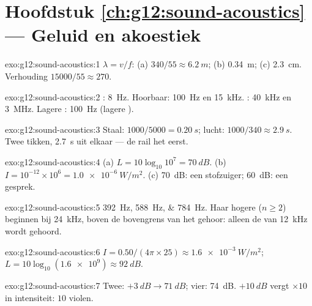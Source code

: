 \section*{Hoofdstuk \ref{ch:g12:sound-acoustics} --- Geluid en akoestiek}

\begin{solution}{exo:g12:sound-acoustics:1}
$\lambda = v/f$: (a) $340/55 \approx \qty{6.2}{m}$; (b) \qty{0.34}{m};
(c) \qty{2.3}{cm}. Verhouding $15000/55 \approx 270$.
\end{solution}

\begin{solution}{exo:g12:sound-acoustics:2}
: \qty{8}{Hz}. Hoorbaar: \qty{100}{Hz} en \qty{15}{kHz}.
: \qty{40}{kHz} en \qty{3}{MHz}. Lagere :
\qty{100}{Hz} (lagere ).
\end{solution}

\begin{solution}{exo:g12:sound-acoustics:3}
Staal: $1000/5000 = \qty{0.20}{s}$; lucht:
$1000/340 \approx \qty{2.9}{s}$. Twee tikken, \qty{2.7}{s} uit elkaar ---
de rail het eerst.
\end{solution}

\begin{solution}{exo:g12:sound-acoustics:4}
(a) $L = 10\log_{10}10^{7} = \qty{70}{dB}$. (b) $I = 10^{-12} \times
10^{6} = \qty{1.0e-6}{W/m^2}$. (c) \qty{70}{dB}: een stofzuiger;
\qty{60}{dB}: een gesprek.
\end{solution}

\begin{solution}{exo:g12:sound-acoustics:5}
\qtylist{392;588;784}{Hz}. Haar hogere  ($n \ge 2$) beginnen
bij \qty{24}{kHz}, boven de bovengrens van het gehoor: alleen de
 van \qty{12}{kHz} wordt gehoord.
\end{solution}

\begin{solution}{exo:g12:sound-acoustics:6}
$I = 0.50/(4\pi \times 25) \approx \qty{1.6e-3}{W/m^2}$;
$L = 10\log_{10}(\num{1.6e9}) \approx \qty{92}{dB}$.
\end{solution}

\begin{solution}{exo:g12:sound-acoustics:7}
Twee: $+\qty{3}{dB} \to \qty{71}{dB}$; vier: \qty{74}{dB}.
$+\qty{10}{dB}$ vergt $\times 10$ in intensiteit: $10$ violen.
\end{solution}

